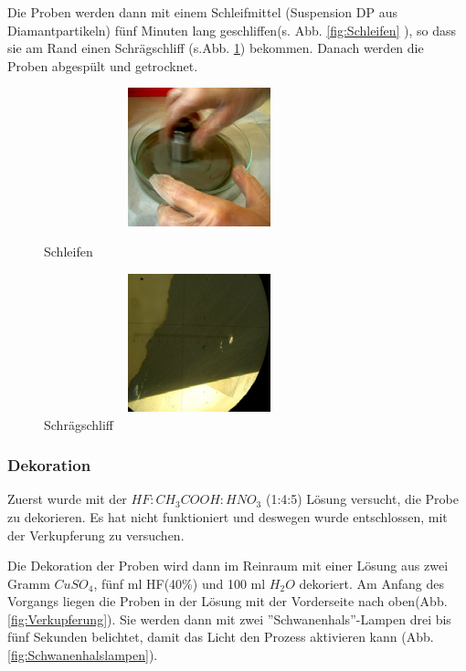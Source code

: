 Die Proben werden dann mit einem Schleifmittel (Suspension DP aus Diamantpartikeln) fünf Minuten lang geschliffen(s. Abb. \ref{fig:Schleifen} ), so dass sie am Rand einen Schrägschliff (s.Abb. \ref{fig:SchraegschliffunterdemMikroskop}) bekommen. Danach werden die Proben abgespült und getrocknet.

\begin{figure}[H]
\centering
\begin{minipage}[hbt]{6cm}
    \centering
    \includegraphics[width=0.8\textwidth, height=4cm]{bilder/Schleifen.png}
  \caption{Schleifen}
  \label{fig:Schleifen}
\end{minipage}
\hfill
\begin{minipage}[hbt]{7cm}
    \centering
    \includegraphics[width=0.8\textwidth,height=4cm]{bilder/SchraegschliffunterdemMikroskop.png}
  \caption{Schrägschliff }
  \label{fig:SchraegschliffunterdemMikroskop}
\end{minipage}

\end{figure}


\subsubsection[Dekoration]{Dekoration }


Zuerst wurde mit der $HF:CH_{3}COOH:HNO_{3}$ (1:4:5) Lösung versucht, die Probe zu dekorieren. Es hat nicht funktioniert und deswegen wurde entschlossen, mit der Verkupferung zu versuchen.

Die Dekoration der Proben wird dann im Reinraum mit einer Lösung aus zwei Gramm
$CuSO_{4}$, fünf ml HF(40\%) und 100 ml $H_{2}O$ dekoriert. Am Anfang des Vorgangs liegen die
Proben in der Lösung mit der Vorderseite nach oben(Abb. \ref{fig:Verkupferung}). Sie werden dann mit zwei ''Schwanenhals''-Lampen drei bis fünf Sekunden belichtet, damit das Licht den Prozess aktivieren kann (Abb. \ref{fig:Schwanenhalslampen}).

